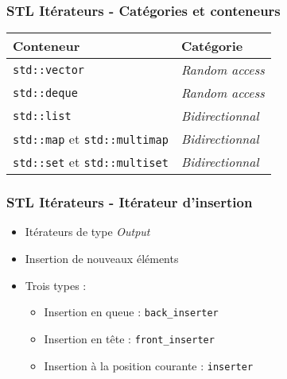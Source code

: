 \documentclass[C++.tex]{subfiles}
\begin{document}
\begin{frame}
	\frametitle{STL Itérateurs - Catégories et conteneurs}
	\begin{tabular}{ | p{5cm} | p{5cm} |}
		\hline
		Conteneur & Catégorie \\ 
		\hline
		\lstinline{std::vector} & \textit{Random access} \\ 
		\hline
		\lstinline{std::deque} & \textit{Random access} \\ 
		\hline
		\lstinline{std::list} & \textit{Bidirectionnal} \\ 
		\hline
		\lstinline{std::map} et \lstinline{std::multimap} & \textit{Bidirectionnal} \\ 
		\hline
		\lstinline{std::set} et \lstinline{std::multiset} & \textit{Bidirectionnal} \\ 
		\hline
	\end{tabular} 
\end{frame}

\begin{frame}
	\frametitle{STL Itérateurs - Itérateur d'insertion}
	\begin{itemize}
		\item Itérateurs de type \textit{Output}


		\item Insertion de nouveaux éléments


		\item Trois types :
		\begin{itemize}
			\item Insertion en queue : \lstinline|back_inserter|
			\item Insertion en tête : \lstinline|front_inserter|
			\item Insertion à la position courante : \lstinline|inserter|


		\end{itemize}
	\end{itemize}
\end{frame}
\end{document}
